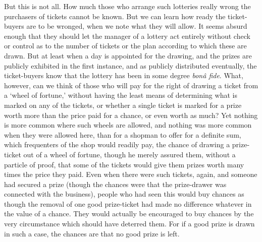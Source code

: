 \documentclass[letterpaper,12pt,oneside,openany]{memoir}
\begin{document}
But this is not all. How much those who arrange such
lotteries really wrong the purchasers of tickets cannot
be known. But we can learn how ready the ticket-buyers
are to be wronged, when we note what they will
allow. It seems absurd enough that they should let the
manager of a lottery act entirely without check or control
as to the number of tickets or the plan according to
which these are drawn. But at least when a day is
appointed for the drawing, and the prizes are publicly
exhibited in the first instance, and as publicly distributed
eventually, the ticket-buyers know that the lottery has
been in some degree \textit{bon\^a fide}. What, however, can we
think of those who will pay for the right of drawing a
ticket from a `wheel of fortune,' without having the
least means of determining what is marked on any of
the tickets, or whether a single ticket is marked for a
prize worth more than the price paid for a chance, or
even worth as much? Yet nothing is more common
where such wheels are allowed, and nothing was more
common when they were allowed here, than for a shopman
to offer for a definite sum, which frequenters of the
shop would readily pay, the chance of drawing a prize-ticket
out of a wheel of fortune, though he merely
assured them, without a particle of proof, that some of
the tickets would give them prizes worth many times
the price they paid. Even when there were such
tickets, again, and someone had secured a prize (though
the chances were that the prize-drawer was connected
with the business), people who had seen this would buy
chances as though the removal of one good prize-ticket
had made no difference whatever in the value of a
chance. They would actually be encouraged to buy
chances by the very circumstance which should have
deterred them. For if a good prize is drawn in such a
case, the chances are that no good prize is left.
\end{document}
